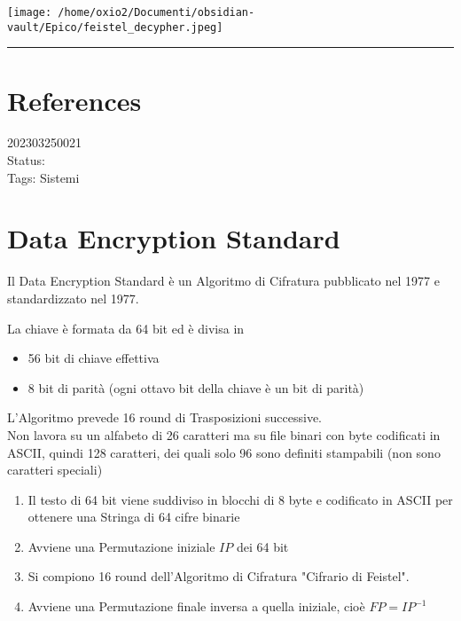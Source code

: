 \documentclass[
]{article}
\providecommand{\tightlist}{%
  \setlength{\itemsep}{0pt}\setlength{\parskip}{0pt}}
\begin{document}
\texttt{[image: /home/oxio2/Documenti/obsidian-vault/Epico/feistel\_decypher.jpeg]}

\begin{center}\rule{0.5\linewidth}{0.5pt}\end{center}

\hypertarget{references-13}{%
\section{References}\label{references-13}}

\hfill\break

202303250021\\
Status:\\
Tags: Sistemi

\hypertarget{data-encryption-standard}{%
\section{Data Encryption Standard}\label{data-encryption-standard}}

Il Data Encryption Standard è un Algoritmo di Cifratura pubblicato nel
1977 e standardizzato nel 1977.

La chiave è formata da 64 bit ed è divisa in

\begin{itemize}
\tightlist
\item
  56 bit di chiave effettiva
\item
  8 bit di parità (ogni ottavo bit della chiave è un bit di parità)
\end{itemize}

L'Algoritmo prevede 16 round di Trasposizioni successive.\\
Non lavora su un alfabeto di 26 caratteri ma su file binari con byte
codificati in ASCII, quindi 128 caratteri, dei quali solo 96 sono
definiti stampabili (non sono caratteri speciali)

\begin{enumerate}
\tightlist
\item
  Il testo di 64 bit viene suddiviso in blocchi di 8 byte e codificato
  in ASCII per ottenere una Stringa di 64 cifre binarie
\item
  Avviene una Permutazione iniziale {\(IP\)} dei 64 bit
\item
  Si compiono 16 round dell'Algoritmo di Cifratura "Cifrario di
  Feistel".
\item
  Avviene una Permutazione finale inversa a quella iniziale, cioè
  {\(FP = IP^{- 1}\)}
\end{enumerate}
\end{document}
